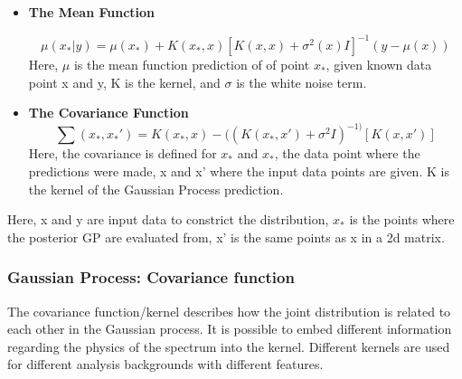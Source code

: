     \begin{itemize}

        \item \textbf{The Mean Function}

    \begin{equation}
        \mu(x_{*}|y)  = \mu(x_{*})+ K(x_{*}, x)[K(x, x)+ \sigma^{2}(x)I]^{-1}(y-\mu(x))
    \end{equation}
    Here, $\mu$ is the mean function prediction of of point $x_{*}$, given known data point x and y, K is the kernel, and $\sigma$ is the white noise term.

    \item \textbf{The Covariance Function}
    \begin{equation}
        \sum(x_{*}, x_{*}') = K(x_{*}, x) - ((K(x_{*}, x')+\sigma^{2}I)^{-1)}[K(x, x')]
    \end{equation}  
    Here, the covariance is defined for $x_{*}$ and $x_{*}$, the data point where the predictions were made, x and x' where the input data points are given. K is the kernel of the Gaussian Process prediction.

    \end{itemize}

    Here, x and y are input data to constrict the distribution, $x_{*}$ is the points where the posterior GP are evaluated from, x' is the same points as x in a 2d matrix.

\subsubsection{Gaussian Process: Covariance function}
\label{sec:kernel}
The covariance function/kernel describes how the joint distribution is related to each other in the Gaussian process. 
It is possible to embed different information regarding the physics of the spectrum into the kernel. 
Different kernels are used for different analysis backgrounds with different features. 

